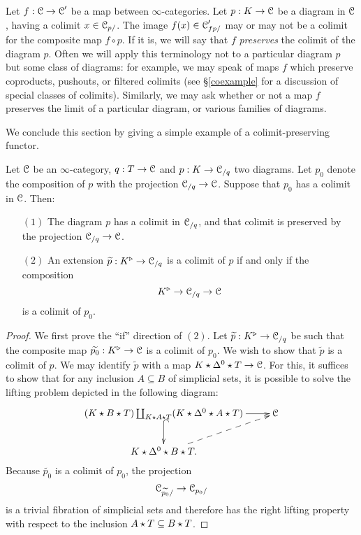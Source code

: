 \begin{1.2.13 Limits and colimits}
Let $f: \operatorname{\mathcal{C}} \rightarrow \operatorname{\mathcal{C}}'$ be a map between $\infty$-categories. Let $p: K
\rightarrow \operatorname{\mathcal{C}}$ be a diagram in $\operatorname{\mathcal{C}}$, having a colimit $x \in \operatorname{\mathcal{C}}_{p/}$.
The image $f(x) \in \operatorname{\mathcal{C}}'_{f p/}$ may or may not be a colimit for the composite map
$f \circ p$. If it is, we will say that $f$ {\it preserves} the colimit of the diagram $p$.
Often we will apply this terminology not to a particular diagram $p$ but some class of diagrams: for example, we may speak of maps $f$ which
preserve coproducts, pushouts, or filtered colimits (see \S \ref{coexample} for a discussion of special classes of colimits). Similarly, we may ask whether or not a map $f$
preserves the limit of a particular diagram, or various families of diagrams.

We conclude this section by giving a simple example of a colimit-preserving functor.

\begin{proposition}\label{needed17}
Let $\operatorname{\mathcal{C}}$ be an $\infty$-category, $q: T \rightarrow \operatorname{\mathcal{C}}$ and $p: K \rightarrow \operatorname{\mathcal{C}}_{/q}$ two diagrams. Let $p_0$ denote the composition of $p$ with the projection 
$\operatorname{\mathcal{C}}_{/q} \rightarrow \operatorname{\mathcal{C}}$. Suppose that $p_0$ has a colimit in $\operatorname{\mathcal{C}}$. Then:
\begin{itemize}
\item[$(1)$] The diagram $p$ has a colimit in $\operatorname{\mathcal{C}}_{/q}$, and that colimit is preserved by the projection $\operatorname{\mathcal{C}}_{/q} \rightarrow \operatorname{\mathcal{C}}$.

\item[$(2)$] An extension $\widetilde{p}: K^{\triangleright} \rightarrow \operatorname{\mathcal{C}}_{/q}$ is a colimit
of $p$ if and only if the composition
$$K^{\triangleright} \rightarrow \operatorname{\mathcal{C}}_{/q} \rightarrow \operatorname{\mathcal{C}}$$
is a colimit of $p_0$.

\end{itemize}
\end{proposition}

\begin{proof}
We first prove the ``if'' direction of $(2)$. Let $\widetilde{p}: K^{\triangleright} \rightarrow \operatorname{\mathcal{C}}_{/q}$ be such that the composite map $\widetilde{p_0}: K^{\triangleright} \rightarrow \operatorname{\mathcal{C}}$ is a colimit of $p_0$. We wish to show that $\widetilde{p}$ is a colimit of $p$. We may identify $\widetilde{p}$ with a map $K \star \Delta^0 \star T \rightarrow \operatorname{\mathcal{C}}$. For this, it suffices to show that
for any inclusion $A \subseteq B$ of simplicial sets, it is possible to solve the lifting problem depicted in the following diagram:
$$ \xymatrix{ (K \join B \join T) \coprod_{ K \join A \join T} ( K \join \Delta^0 \join A \join T )
\ar@{^{(}->}[d] \ar[r] & \calC \\
K \join \Delta^0 \join B \join T. \ar@{-->}[ur] & }$$
Because $\widetilde{p_0}$ is a colimit of $p_0$, the projection
$$ \operatorname{\mathcal{C}}_{\widetilde{p_0}/} \rightarrow \operatorname{\mathcal{C}}_{p_0/}$$ is a trivial fibration of simplicial
sets and therefore has the right lifting property with respect to the inclusion
$A \star T \subseteq B \star T$.


\end{proof}
\end{1.2.13 Limits and colimits}
